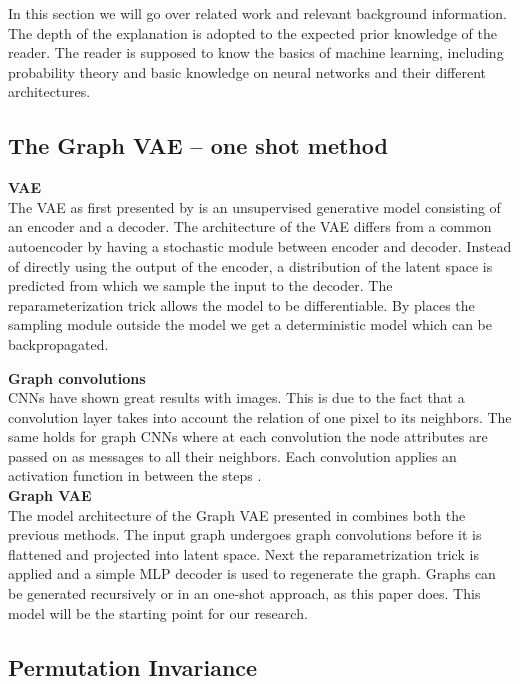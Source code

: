 In this section we will go over related work and relevant background information. The depth of the explanation is adopted to the expected prior knowledge of the reader. The reader is supposed to know the basics of machine learning, including probability theory and basic knowledge on neural networks and their different architectures.

\subsection{The Graph VAE – one shot method}

\textbf{VAE}\\
The VAE as first presented by \cite{kingma_auto-encoding_2014} is an unsupervised generative model consisting of an encoder and a decoder. The architecture of the VAE differs from a common autoencoder by having a stochastic module between encoder and decoder. Instead of directly using the output of the encoder, a distribution of the latent space is predicted from which we sample the input to the decoder. The reparameterization trick allows the model to be differentiable. By places the sampling module outside the model we get a deterministic model which can be backpropagated.

\textbf{Graph convolutions}\\
CNNs have shown great results with images. This is due to the fact that a convolution layer takes into account the relation of one pixel to its neighbors. The same holds for graph CNNs where at each convolution the node attributes are passed on as messages to all their neighbors. Each convolution applies an activation function in between the steps \cite{tiao_variational_nodate}. \\
\textbf{Graph VAE}\\
The model architecture of the Graph VAE presented in \cite{simonovsky_graphvae_2018} combines both the previous methods. The input graph undergoes graph convolutions before it is flattened and projected into latent space. Next the reparametrization trick is applied and a simple MLP decoder is used to regenerate the graph.
Graphs can be generated recursively or in an one-shot approach, as this paper does.
This model will be the starting point for our research.




\subsection{Permutation Invariance}

